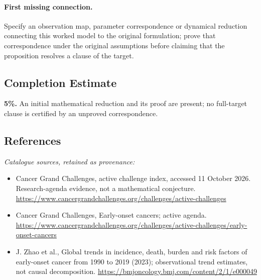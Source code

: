 \documentclass[11pt]{article}
\begin{document}
\paragraph{First missing connection.} Specify an observation map, parameter correspondence or dynamical reduction connecting this worked model to the original formulation; prove that correspondence under the original assumptions before claiming that the proposition resolves a clause of the target.
\subsection{Completion Estimate}
\textbf{5\%.} An initial mathematical reduction and its proof are present; no full-target clause is certified by an unproved correspondence.
\subsection{References}
\noindent\emph{Catalogue sources, retained as provenance:}
\begin{itemize}
\item Cancer Grand Challenges, active challenge index, accessed 11 October 2026. Research-agenda evidence, not a mathematical conjecture. \url{https://www.cancergrandchallenges.org/challenges/active-challenges}
\item Cancer Grand Challenges, Early-onset cancers; active agenda. \url{https://www.cancergrandchallenges.org/challenges/active-challenges/early-onset-cancers}
\item J. Zhao et al., Global trends in incidence, death, burden and risk factors of early-onset cancer from 1990 to 2019 (2023); observational trend estimates, not causal decomposition. \url{https://bmjoncology.bmj.com/content/2/1/e000049}
\end{itemize}
\end{document}
